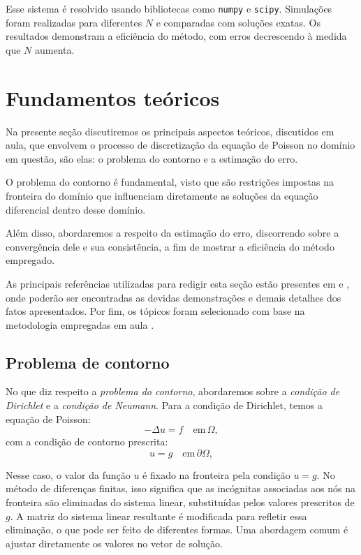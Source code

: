 \documentclass[column,amsmath,amssymb,floatfix]{revtex4}
\begin{document}
        Esse sistema é resolvido usando bibliotecas como \texttt{numpy} e \texttt{scipy}. Simulações foram realizadas para diferentes $N$ e comparadas com soluções exatas. Os resultados demonstram a eficiência do método, com erros decrescendo à medida que $N$ aumenta. 
    
    \section{Fundamentos teóricos}
        Na presente seção discutiremos os principais aspectos teóricos, discutidos em aula, que envolvem o processo de discretização da equação de Poisson no domínio em questão, são elas: o problema do contorno e a estimação do erro.
        
        O problema do contorno é fundamental, visto que são restrições impostas na fronteira do domínio que influenciam diretamente as soluções da equação diferencial dentro desse domínio. 

        Além disso, abordaremos a respeito da estimação do erro, discorrendo sobre a convergência dele e sua consistência, a fim de mostrar a eficiência do método empregado. 
        
        As principais referências utilizadas para redigir esta seção estão presentes em \cite{Chen2014} e \cite{Butler2021}, onde poderão ser encontradas as devidas demonstrações e demais detalhes dos fatos apresentados. Por fim, os tópicos foram selecionado com base na metodologia empregadas em aula \cite{Kuhl2024}. 
    
        \subsection{Problema de contorno}

            No que diz respeito a \textit{problema do contorno}, abordaremos sobre a \textit{condição de Dirichlet} e a \textit{condição de Neumann}. Para a condição de Dirichlet, temos a equação de Poisson:
            \begin{equation*}
                -\Delta u = f \quad \text{em} \, \Omega,
            \end{equation*}
            com a condição de contorno prescrita:
            \begin{equation*}
                u = g \quad \text{em} \, \partial \Omega,
            \end{equation*}
            
            Nesse caso, o valor da função $u$ é fixado na fronteira pela condição $u = g$. No método de diferenças finitas, isso significa que as incógnitas associadas aos nós na fronteira são eliminadas do sistema linear, substituídas pelos valores prescritos de $g$. A matriz do sistema linear resultante é modificada para refletir essa eliminação, o que pode ser feito de diferentes formas. Uma abordagem comum é ajustar diretamente os valores no vetor de solução.
            
\end{document}
